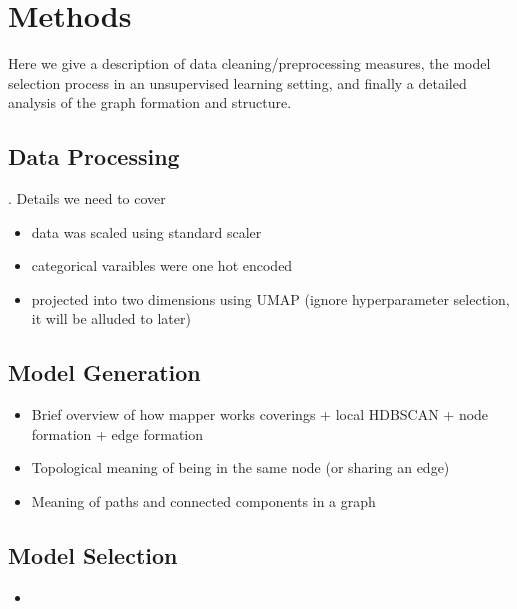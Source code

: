 \section{Methods}

Here we give a description of data cleaning/preprocessing measures, the model selection 
process in an unsupervised learning setting, and finally a detailed analysis of the 
graph formation and structure. 


\subsection{Data Processing}

. 
Details we need to cover
\begin{itemize}
    \item data was scaled using standard scaler 
    \item categorical varaibles were one hot encoded 
    \item projected into two dimensions using UMAP (ignore hyperparameter selection, 
    it will be alluded to later)
\end{itemize}


\subsection{Model Generation}

\begin{itemize}
    \item Brief overview of how mapper works coverings + local HDBSCAN + node formation + edge formation
    \item Topological meaning of being in the same node (or sharing an edge)
    \item Meaning of paths and connected components in a graph 
\end{itemize}


\subsection{Model Selection}

\begin{itemize}
    \item 
\end{itemize}